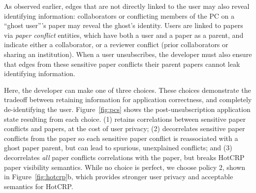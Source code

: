 
As observed earlier, edges that are not directly linked to the user may also reveal identifying
information: collaborators or conflicting members of the PC on a ``ghost user'''s paper may reveal
the ghost's identity. Users are linked to papers via \emph{paper conflict} entities, which have both
a user and a paper as a parent, and indicate either a collaborator, or a reviewer
conflict (prior collaborators or sharing an institution). When a user unsubscribes, the developer
must also ensure that edges from these sensitive paper conflicts their parent papers cannot leak
identifying information.

Here, the developer can make one of three choices. 
These choices demonstrate the tradeoff between retaining information for application correctness, and completely de-identifying the user.
Figure~\ref{fig:pcs} shows the post-unsubscription application state resulting from each choice.
%
(1) retains correlations between sensitive paper conflicts and papers, at the cost of
user privacy; (2) decorrelates sensitive paper conflicts from the paper so each
sensitive paper conflict is reassociated with a ghost paper parent, but can lead to spurious,
unexplained conflicts; and (3) decorrelates \emph{all} paper conflicts correlations
with the paper, but breaks HotCRP paper visibility semantics.
While no choice is perfect, we choose policy 2, shown in Figure~\ref{fig:hotcrp}b, which provides
stronger user privacy and acceptable semantics for HotCRP.

